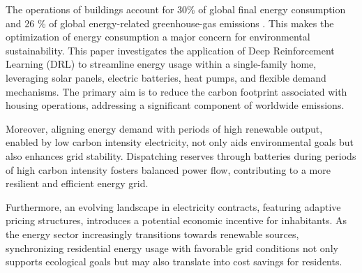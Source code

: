 The operations of buildings account for 30\% of global final energy consumption and 26 \%
of global energy-related greenhouse-gas emissions \cite{IEA.06.01.2024}. This makes the optimization of energy consumption a major concern for environmental sustainability. This paper investigates the application of Deep Reinforcement Learning (DRL) to streamline energy usage within a single-family home, leveraging solar panels, electric batteries, heat pumps, and flexible demand mechanisms. The primary aim is to reduce the carbon footprint associated with housing operations, addressing a significant component of worldwide emissions.

Moreover,  aligning energy demand with periods of high renewable output, enabled by low carbon intensity electricity, not only aids environmental goals but also enhances grid stability. Dispatching reserves through batteries during periods of high carbon intensity fosters balanced power flow, contributing to a more resilient and efficient energy grid.

Furthermore, an evolving landscape in electricity contracts, featuring adaptive pricing structures, introduces a potential economic incentive for inhabitants. As the energy sector increasingly transitions towards renewable sources, synchronizing residential energy usage with favorable grid conditions not only supports ecological goals but may also translate into cost savings for residents.